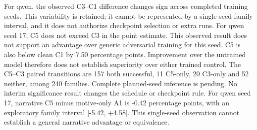 For qwen, the observed C3--C1 difference changes sign across completed training seeds. This variability is retained; it cannot be represented by a single-seed family interval, and it does not authorize checkpoint selection or extra runs.
For qwen seed 17, C5 does not exceed C3 in the point estimate. This observed result does not support an advantage over generic adversarial training for this seed.
C5 is also below clean C1 by 7.50 percentage points. Improvement over the untrained model therefore does not establish superiority over either trained control.
The C5--C3 paired transitions are 157 both successful, 11 C5-only, 20 C3-only and 52 neither, among 240 families.
Complete planned-seed inference is pending. No interim significance result changes the schedule or checkpoint rule.
For qwen seed 17, narrative C5 minus motive-only A1 is -0.42 percentage points, with an exploratory family interval [-5.42, +4.58]. This single-seed observation cannot establish a general narrative advantage or equivalence.
